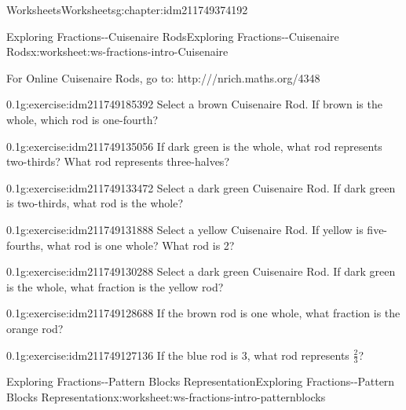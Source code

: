 \documentclass[twoside,11pt,]{book}
\begin{document}
\begin{chapterptx}{Worksheets}{}{Worksheets}{}{}{g:chapter:idm211749374192}
\begin{worksheet-section-numberless}{Exploring Fractions-{}-{}Cuisenaire Rods}{}{Exploring Fractions-{}-{}Cuisenaire Rods}{}{}{x:worksheet:ws-fractions-intro-Cuisenaire}
\begin{introduction}{}%
For Online Cuisenaire Rods, go to: http:\slash{}\slash{}\slash{}nrich.maths.org\slash{}4348%
\end{introduction}%
\begin{divisionexercise}{1}{}{0.1}{g:exercise:idm211749185392}%
Select a brown Cuisenaire Rod.  If brown is the whole, which rod is one-fourth?%
\end{divisionexercise}%
\begin{divisionexercise}{2}{}{0.1}{g:exercise:idm211749135056}%
If dark green is the whole, what rod represents two-thirds? What rod represents three-halves?%
\end{divisionexercise}%
\begin{divisionexercise}{3}{}{0.1}{g:exercise:idm211749133472}%
Select a dark green Cuisenaire Rod.  If dark green is two-thirds, what rod is the whole?%
\end{divisionexercise}%
\begin{divisionexercise}{4}{}{0.1}{g:exercise:idm211749131888}%
Select a yellow Cuisenaire Rod.  If yellow is five-fourths, what rod is one whole? What rod is 2?%
\end{divisionexercise}%
\begin{divisionexercise}{5}{}{0.1}{g:exercise:idm211749130288}%
Select a dark green Cuisenaire Rod.  If dark green is the whole, what fraction is the yellow rod?%
\end{divisionexercise}%
\begin{divisionexercise}{6}{}{0.1}{g:exercise:idm211749128688}%
If the brown rod is one whole, what fraction is the orange rod?%
\end{divisionexercise}%
\begin{divisionexercise}{7}{}{0.1}{g:exercise:idm211749127136}%
If the blue rod is 3, what rod represents \(\frac{2}{3} \)?%
\end{divisionexercise}%
\end{worksheet-section-numberless}
\restoregeometry
%
%
\typeout{************************************************}
\typeout{************************************************}
%
\begin{worksheet-section-numberless}{Exploring Fractions-{}-{}Pattern Blocks Representation}{}{Exploring Fractions-{}-{}Pattern Blocks Representation}{}{}{x:worksheet:ws-fractions-intro-patternblocks}
\begin{introduction}{}%

\end{introduction}
\end{worksheet-section-numberless}
\end{chapterptx}
\end{document}
